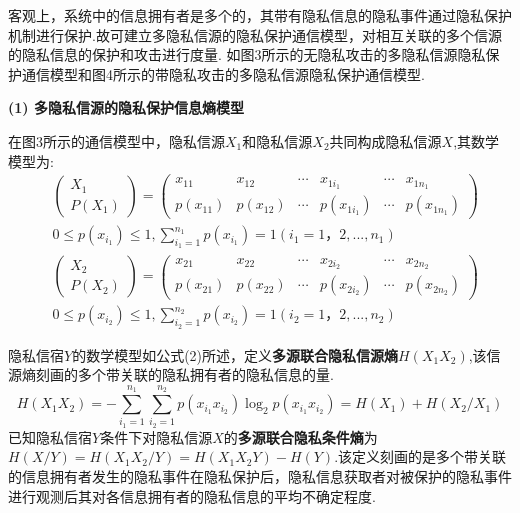 客观上，系统中的信息拥有者是多个的，其带有隐私信息的隐私事件通过隐私保护机制进行保护.故可建立多隐私信源的隐私保护通信模型，对相互关联的多个信源的隐私信息的保护和攻击进行度量. 如图3所示的无隐私攻击的多隐私信源隐私保护通信模型和图4所示的带隐私攻击的多隐私信源隐私保护通信模型.

\textbf{(1) 多隐私信源的隐私保护信息熵模型}


在图3所示的通信模型中，隐私信源$X_{1}$和隐私信源$X_{2}$共同构成隐私信源$X$,其数学模型为:
\begin{equation}
\begin{split}
&\begin{pmatrix}
X_{1}\\ 
P(X_{1})
\end{pmatrix}=\begin{pmatrix}
x_{11} & x_{12} & \cdots  & x_{1i_{1}} & \cdots  & x_{1n_{1}}\\ 
p(x_{11})& p(x_{12}) & \cdots & p(x_{1i_{1}}) & \cdots & p(x_{1n_{1}})
\end{pmatrix} \\
&0\leqslant p(x_{i_{1}})\leqslant 1,\sum_{i_{1}=1}^{n_{1}}p(x_{i_{1}})=1(i_{1}=1，2,...,n_{1})
\end{split}
\end{equation}
\begin{equation}
\begin{split}
&\begin{pmatrix}
X_{2}\\ 
P(X_{2})
\end{pmatrix}=\begin{pmatrix}
x_{21} & x_{22} & \cdots  & x_{2i_{2}} & \cdots  & x_{2n_{2}}\\ 
p(x_{21})& p(x_{22}) & \cdots & p(x_{2i_{2}}) & \cdots & p(x_{2n_{2}})
\end{pmatrix} \\
&0\leqslant p(x_{i_{2}})\leqslant 1,\sum_{i_{2}=1}^{n_{2}}p(x_{i_{2}})=1(i_{2}=1，2,...,n_{2})
\end{split}
\end{equation}

隐私信宿$Y$的数学模型如公式(2)所述，定义\textbf{多源联合隐私信源熵}$H(X_{1}X_{2})$,该信源熵刻画的多个带关联的隐私拥有者的隐私信息的量.
\begin{equation}
H(X_{1}X_{2}) = -\sum_{i_{1}=1}^{n_{1}}\sum_{i_{2}=1}^{n_{2}}p(x_{i_{1}}x_{i_{2}})\log_{2}p(x_{i_{1}}x_{i_{2}})=H(X_{1})+H(X_{2}/X_{1})
\end{equation}
已知隐私信宿$Y$条件下对隐私信源$X$的\textbf{多源联合隐私条件熵}为$H(X/Y)=H(X_{1}X_{2}/Y)=H(X_{1}X_{2}Y)-H(Y)$.该定义刻画的是多个带关联的信息拥有者发生的隐私事件在隐私保护后，隐私信息获取者对被保护的隐私事件进行观测后其对各信息拥有者的隐私信息的平均不确定程度.

